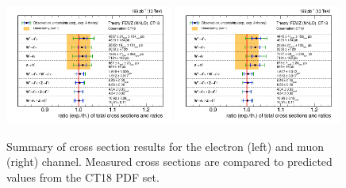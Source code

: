 \begin{figure}[htpb]
\includegraphics[width=0.49\textwidth]{plots/Results/xsecSummary5TeV_ele_ct18.png}
\includegraphics[width=0.49\textwidth]{plots/Results/xsecSummary5TeV_muon_ct18.png}
\caption{Summary of cross section results for the \sg electron (left) and muon (right) channel. Measured cross sections are compared to predicted values from the CT18 PDF set.}
\label{fig:xs:ct18:5}
\end{figure}